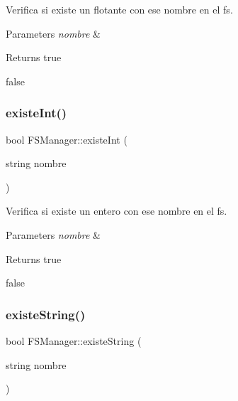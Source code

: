 Verifica si existe un flotante con ese nombre en el fs. 


\begin{DoxyParams}{Parameters}
{\em nombre} & \\
\hline
\end{DoxyParams}
\begin{DoxyReturn}{Returns}
true 

false 
\end{DoxyReturn}
\mbox{\label{classFSManager_aae892b79cec4fc940972e9ab008e241e}} 
\subsubsection{\texorpdfstring{existe\+Int()}{existeInt()}}
{\footnotesize\ttfamily bool F\+S\+Manager\+::existe\+Int (\begin{DoxyParamCaption}\item[{string}]{nombre }\end{DoxyParamCaption})\hspace{0.3cm}{\ttfamily [inline]}}



Verifica si existe un entero con ese nombre en el fs. 


\begin{DoxyParams}{Parameters}
{\em nombre} & \\
\hline
\end{DoxyParams}
\begin{DoxyReturn}{Returns}
true 

false 
\end{DoxyReturn}
\mbox{\label{classFSManager_a0756a23591bc8fcd3c40a58af9881d34}} 
\subsubsection{\texorpdfstring{existe\+String()}{existeString()}}
{\footnotesize\ttfamily bool F\+S\+Manager\+::existe\+String (\begin{DoxyParamCaption}\item[{string}]{nombre }\end{DoxyParamCaption})\hspace{0.3cm}{\ttfamily [inline]}}



